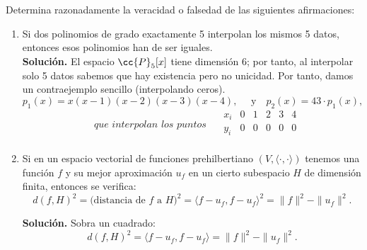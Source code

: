 \documentclass[12pt]{article}
\begin{document}
	\newpage
	\setcounter{ejercicio}{0}
	\begin{ejercicio}
		Determina razonadamente la veracidad o falsedad de las siguientes afirmaciones:
		\begin{enumerate}[label=\alph*)]
			\item Si dos polinomios de grado exactamente 5 interpolan los mismos 5 datos, entonces esos polinomios han de ser iguales. \\
			
				\textbf{Solución. } El espacio $\cc{P}_5[x]$ tiene dimensión 6; por tanto, al interpolar solo 5 datos sabemos que hay existencia pero no unicidad. Por tanto, damos un contraejemplo sencillo (interpolando ceros).\\
				$$p_1(x) = x(x - 1)(x - 2)(x - 3)(x - 4), \quad \text{ y} \quad p_2(x) = 43 \cdot p_1(x), $$
				$$\quad \textit{que interpolan los puntos } \quad
				\begin{array}{c|ccccc}
					x_i & 0 & 1 & 2 & 3 & 4 \\
					\hline
					y_i & 0 & 0 & 0 & 0 & 0 \\
				\end{array}$$
				
			\item Si en un espacio vectorial de funciones prehilbertiano $(V, \langle \cdot, \cdot \rangle)$ tenemos una función $f$ y su mejor aproximación $u_f$ en un cierto subespacio $H$ de dimensión finita, entonces se verifica:
			$$ d(f, H)^2 = \text{(distancia de } f \text{ a } H)^2 = \langle f - u_f, f - u_f \rangle^2 = \|f\|^2 - \|u_f\|^2.$$
			
				\textbf{Solución. } Sobra un cuadrado:
				$$ d(f, H)^2 = \langle f - u_f, f - u_f \rangle = \|f\|^2 - \|u_f\|^2.$$
		\end{enumerate}
	\end{ejercicio}
	
\end{document}
